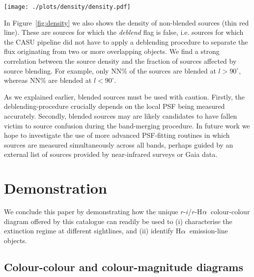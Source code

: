 \documentclass[useAMS,usenatbib]{mn2e}
\def\ha{\mbox{H$\rm \alpha$}}
\begin{document}
\begin{figure*}
    \texttt{[image: ./plots/density/density.pdf]} 
    \caption{Mean number density of sources in the catalogue 
    as a function of Galactic longitude, 
    with and without blended sources included. 
    The densities shown were computed by counting the sources 
    at each longitude between $-5^\circ<b<+5^\circ$ (upper blue line).
    We also show the densities based on only counting those sources 
    for which the \emph{deblend} flag is {\sc false}, 
    i.e. unconfused sources for which the CASU pipeline did not have to apply 
    a deblending procedure (lower red line). 
    }
    \label{fig:density}
\end{figure*}

In Figure~\ref{fig:density} we also shows the density
of non-blended sources (thin red line).
These are sources for which the \emph{deblend} flag is {\sc false},
i.e. sources for which the CASU pipeline did not have to apply 
a deblending procedure to separate the flux
originating from two or more overlapping objects.
We find a strong correlation between the source density
and the fraction of sources affected by source blending.
For example, only NN\% of the sources are blended
at $l>90^\circ$, whereas NN\% are blended at $l<90^\circ$.

As we explained earlier, blended sources must be used with caution.
Firstly, the deblending-procedure crucially depends
on the local PSF being measured accurately. 
Secondly, blended sources may are likely candidates to have fallen victim
to source confusion during the band-merging procedure.
In future work we hope to investigate the use of
more advanced PSF-fitting routines
in which sources are measured simultaneously across all bands,
perhaps guided by an external list of sources provided
by near-infrared surveys or Gaia data.

\section{Demonstration}
\label{sec:demonstration}

We conclude this paper by demonstrating how the unique
$r$-$i$/$r$-\ha\ colour-colour diagram offered by this catalogue
can readily be used to
(i) characterise the extinction regime at different sightlines, and
(ii) identify \ha\ emission-line objects.

\subsection{Colour-colour and colour-magnitude diagrams}
\end{document}
